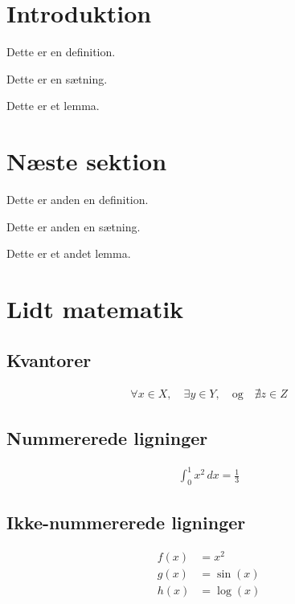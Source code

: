
\section{Introduktion}

\begin{defn}
Dette er en definition.
\end{defn}

\begin{thm}
Dette er en sætning.
\end{thm}

\begin{lemma}
Dette er et lemma.
\end{lemma}

\section{Næste sektion}

\begin{defn}
Dette er anden en definition.
\end{defn}

\begin{thm}
Dette er anden en sætning.
\end{thm}

\begin{lemma}
Dette er et andet lemma.
\end{lemma}

\section{Lidt matematik}

\subsection{Kvantorer}
\begin{align*}
\forall x \in X, \quad \exists y \in Y, \quad \text{og} \quad \nexists z \in Z
\end{align*}

\subsection{Nummererede ligninger}
\begin{align}
\int_0^1 x^2 \, dx = \frac{1}{3}
\end{align}

\subsection{Ikke-nummererede ligninger}
\begin{align*}
f(x) &= x^2 \\
g(x) &= \sin(x) \\
h(x) &= \log(x)
\end{align*}


